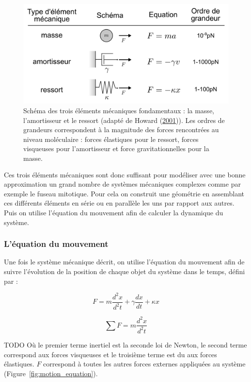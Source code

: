 \documentclass[12pt,a4paper,twoside,openright]{book}
\begin{document}
\begin{figure}[htbp]
\centering
\includegraphics{figures/intro/force_types.png}
\caption[Schéma des trois éléments mécaniques fondamentaux]{\label{fig:force_types}Schéma
des trois éléments mécaniques fondamentaux : la masse, l'amortisseur et
le ressort (adapté de Howard (\hyperref[ref-Howard2001]{2001})). Les
ordres de grandeurs correspondent à la magnitude des forces rencontrées
au niveau moléculaire : forces élastiques pour le ressort, forces
visqueuses pour l'amortisseur et force gravitationnelles pour la masse.}
\end{figure}

Ces trois éléments mécaniques sont donc suffisant pour modéliser avec
une bonne approximation un grand nombre de systèmes mécaniques complexes
comme par exemple le fuseau mitotique. Pour cela on construit une
géométrie en assemblant ces différents éléments en série ou en parallèle
les uns par rapport aux autres. Puis on utilise l'équation du mouvement
afin de calculer la dynamique du système.

\subsubsection{L'équation du mouvement}\label{luxe9quation-du-mouvement}

Une fois le système mécanique décrit, on utilise l'équation du mouvement
afin de suivre l'évolution de la position de chaque objet du système
dans le temps, défini par :

\[
F = m\frac{d^2x}{d^2t} + \gamma\frac{dx}{dt} + \kappa x
\]

\[
\sum F = m\frac{d^2x}{d^2t}
\]

TODO Où le premier terme inertiel est la seconde loi de Newton, le
second terme correspond aux forces visqueuses et le troisième terme est
du aux forces élastiques. \(F\) correspond à toutes les autres forces
externes appliquées au système (Figure~\ref{fig:motion_equation}).
\end{document}
